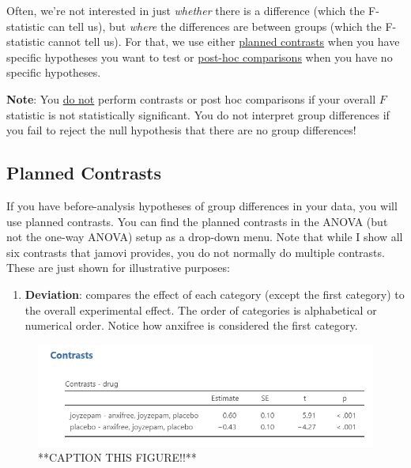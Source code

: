 \documentclass[
]{book}
\providecommand{\tightlist}{%
  \setlength{\itemsep}{0pt}\setlength{\parskip}{0pt}}
\begin{document}
Often, we're not interested in just \emph{whether} there is a difference (which the F-statistic can tell us), but \emph{where} the differences are between groups (which the F-statistic cannot tell us). For that, we use either \underline{planned contrasts} when you have specific hypotheses you want to test or \underline{post-hoc comparisons} when you have no specific hypotheses.

\textbf{Note}: You \underline{do not} perform contrasts or post hoc comparisons if your overall \(F\) statistic is not statistically significant. You do not interpret group differences if you fail to reject the null hypothesis that there are no group differences!

\hypertarget{planned-contrasts}{%
\subsection{Planned Contrasts}\label{planned-contrasts}}

If you have before-analysis hypotheses of group differences in your data, you will use planned contrasts. You can find the planned contrasts in the ANOVA (but not the one-way ANOVA) setup as a drop-down menu. Note that while I show all six contrasts that jamovi provides, you do not normally do multiple contrasts. These are just shown for illustrative purposes:

\begin{enumerate}
\def\labelenumi{\arabic{enumi}.}
\tightlist
\item
  \textbf{Deviation}: compares the effect of each category (except the first category) to the overall experimental effect. The order of categories is alphabetical or numerical order. Notice how anxifree is considered the first category.
\end{enumerate}

\begin{figure}

{\centering \includegraphics[width=1\linewidth]{images/04_one-way-anova/contrasts_deviation} 

}

\caption{**CAPTION THIS FIGURE!!**}\label{fig:unnamed-chunk-8}
\end{figure}
\end{document}
